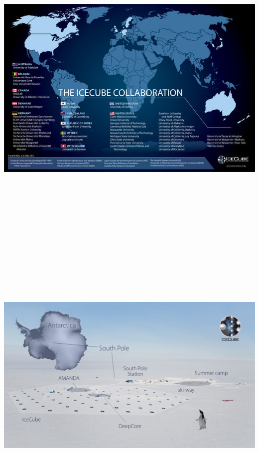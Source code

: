\Tr
\onecolumn
\begin{center}
\includegraphics[keepaspectratio,height=15cm]{icecube-collab2}
\end{center}

\Tr
\begin{center}
\includegraphics[keepaspectratio,height=14.5cm]{pole-view}
\end{center}

